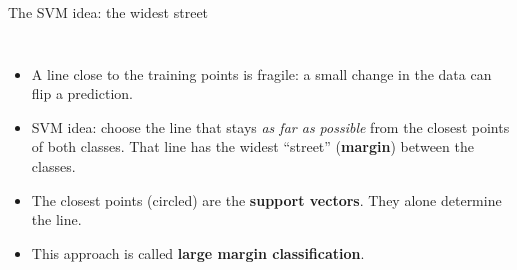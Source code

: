 \documentclass[aspectratio=169,10pt]{beamer}
\newcommand{\axes}{%
  \draw[->,gray] (-0.2,0) -- (6.3,0) node[below] {\scriptsize $x_1$};
  \draw[->,gray] (0,-0.2) -- (0,6.3) node[left] {\scriptsize $x_2$};
}
\newcommand{\posdata}{%
  \foreach \p in {(3,3),(4,2),(5,4),(4.5,3),(3.5,4.5),(5.5,2.2)} \node[ptpos] at \p {};
}
\newcommand{\negdata}{%
  \foreach \p in {(1,1),(0.5,1.5),(0.4,0.6),(1.2,0.3),(0.2,1.2)} \node[ptneg] at \p {};
}
\begin{document}
\begin{frame}{The SVM idea: the widest street}
\begin{columns}[c]
\centering
{}
\begin{itemize}
  \item A line close to the training points is fragile: a small change in the data can flip a prediction.
  \item \alert{SVM idea:} choose the line that stays \emph{as far as possible} from the closest points of both classes. That line has the widest ``street'' (\textbf{margin}) between the classes.
  \item The closest points (circled) are the \textbf{support vectors}. They alone determine the line.
  \item This approach is called \textbf{large margin classification}.
\end{itemize}
\end{columns}
\end{frame}
\end{document}
